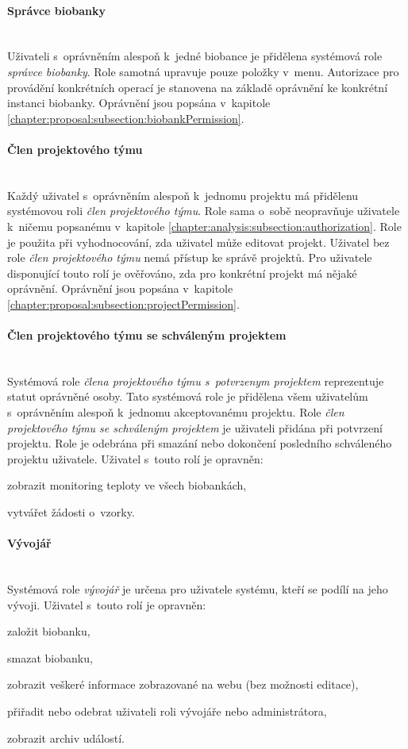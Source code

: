 \documentclass[11pt, final, oneside]{fithesis2}
\newcommand{\paragraphNewLine}[1]{\paragraph*{#1}\mbox{}\\}
\begin{document}
\paragraphNewLine{Správce biobanky}
Uživateli s~oprávněním alespoň k~jedné biobance je přidělena systémová role \textit{správce biobanky}. Role samotná upravuje pouze položky v~menu. Autorizace pro provádění konkrétních operací je stanovena na základě oprávnění ke konkrétní instanci biobanky. Oprávnění jsou popsána v~kapitole \ref{chapter:proposal:subsection:biobankPermission}.  

\paragraphNewLine{Člen projektového týmu} 
Každý uživatel s~oprávněním alespoň k~jednomu projektu má přidělenu systémovou roli \textit{člen projektového týmu}. Role sama o~sobě neopravňuje uživatele k~ničemu popsanému v~kapitole \ref{chapter:analysis:subsection:authorization}. Role je použita při vyhodnocování, zda uživatel může editovat projekt. Uživatel bez role \textit{člen projektového týmu} nemá přístup ke správě projektů. Pro uživatele disponující touto rolí je ověřováno, zda pro konkrétní projekt má nějaké oprávnění. Oprávnění jsou popsána v~kapitole \ref{chapter:proposal:subsection:projectPermission}.  

\paragraphNewLine{Člen projektového týmu se schváleným projektem}
Systémová role \textit{člena projektového týmu s~potvrzenym projektem} reprezentuje statut oprávněné osoby. Tato systémová role je přidělena všem uživatelům s~oprávněním alespoň k~jednomu akceptovanému projektu. Role \textit{člen projektového týmu se schváleným projektem} je uživateli přidána při potvrzení projektu. Role je odebrána při smazání nebo dokončení posledního schváleného projektu uživatele.
Uživatel s~touto rolí je opravněn:
\begin{compactitem}
	\item zobrazit monitoring teploty ve všech biobankách,
	\item vytvářet žádosti o~vzorky.
\end{compactitem}

\paragraphNewLine{Vývojář}
Systémová role \textit{vývojář} je určena pro uživatele systému, kteří se podílí na jeho vývoji.
Uživatel s~touto rolí je opravněn:
\begin{compactitem}
	\item založit biobanku,
	\item smazat biobanku,
	\item zobrazit veškeré informace zobrazované na webu (bez možnosti editace),
	\item přiřadit nebo odebrat uživateli roli vývojáře nebo administrátora,
	\item zobrazit archiv událostí.
\end{compactitem}
\end{document}
